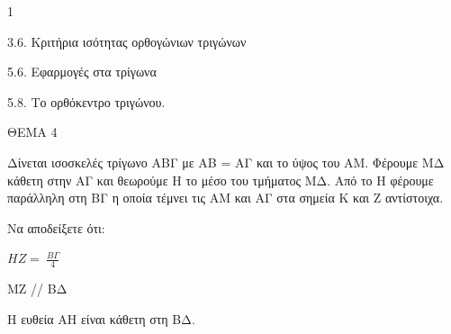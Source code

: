 \begin{ylh}{1}
    \item 3.6. Κριτήρια ισότητας ορθογώνιων τριγώνων
    \item 5.6. Εφαρμογές στα τρίγωνα
    \item 5.8. Το ορθόκεντρο τριγώνου.
\end{ylh}

ΘΕΜΑ 4

Δίνεται ισοσκελές τρίγωνο ΑΒΓ με ΑΒ = ΑΓ και το ύψος του ΑΜ. Φέρουμε ΜΔ κάθετη στην ΑΓ και θεωρούμε Η το μέσο του τμήματος ΜΔ. Από το Η φέρουμε παράλληλη στη ΒΓ η οποία τέμνει τις ΑΜ και ΑΓ στα σημεία Κ και Ζ αντίστοιχα.

Να αποδείξετε ότι:

\begin{alist}
\item $ΗΖ = \ \frac{Β\Gamma}{4}$ 

\item ΜΖ // ΒΔ 

\item Η ευθεία ΑΗ είναι κάθετη στη ΒΔ. 


\end{alist}
